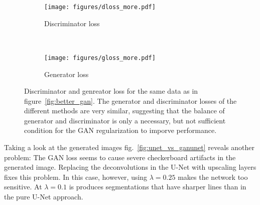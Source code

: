 \documentclass[aps,prl,twocolumn,groupedaddress,amsmath,amssymb]{revtex4-1}
\begin{document}
    \begin{figure}[tbp]
        \begin{center}
        \begin{subfigure}[c]{\linewidth}
            \texttt{[image: figures/dloss\_more.pdf]}
            \caption{Discriminator loss}
        \end{subfigure}\\
        \begin{subfigure}[c]{\linewidth}
             \texttt{[image: figures/gloss\_more.pdf]}
            \caption{Generator loss}
        \end{subfigure}
        \end{center}
        \caption{Discriminator and genreator loss for the same data as in figure~\ref{fig:better_gan}.
        The generator and discriminator losses of the different methods are very similar, suggesting
        that the balance of generator and discriminator is only a necessary, but not sufficient
        condition for the GAN regularization to imporve performance.}
        \label{fig:better_gan_dgloss}
    \end{figure}


    Taking a look at the generated images fig.~\ref{fig:unet_vs_ganunet} reveals another problem: 
    The GAN loss seems to cause severe checkerboard artifacts in the generated image. Replacing the
    deconvolutions in the U-Net with upscaling layers fixes this problem. In this case, however, 
    using $\lambda=0.25$ makes the network too sensitive. At $\lambda=0.1$ is produces segmentations
    that have sharper lines than in the pure U-Net approach.
\end{document}
